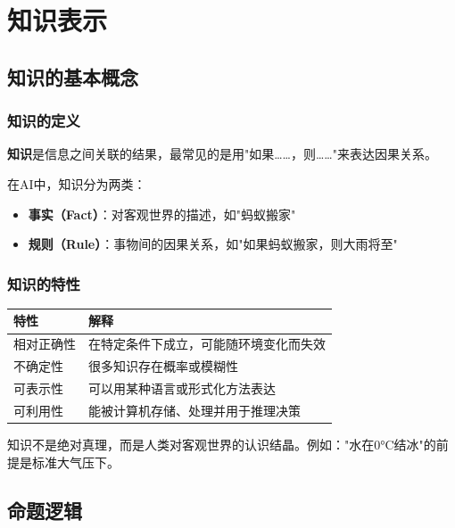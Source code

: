 \chapter{知识表示}

\section{知识的基本概念}

\subsection{知识的定义}
\begin{conceptbox}
\textbf{知识}是信息之间关联的结果，最常见的是用"如果……，则……"来表达因果关系。
\end{conceptbox}

在AI中，知识分为两类：
\begin{itemize}[leftmargin=2em,itemsep=0pt]
    \item \textbf{事实（Fact）}：对客观世界的描述，如"蚂蚁搬家"
    \item \textbf{规则（Rule）}：事物间的因果关系，如"如果蚂蚁搬家，则大雨将至"
\end{itemize}

\subsection{知识的特性}
\begin{table}[htbp]
\centering\small
\begin{tabular}{ll}
\toprule
\textbf{特性} & \textbf{解释} \\
\midrule
相对正确性 & 在特定条件下成立，可能随环境变化而失效 \\
不确定性 & 很多知识存在概率或模糊性 \\
可表示性 & 可以用某种语言或形式化方法表达 \\
可利用性 & 能被计算机存储、处理并用于推理决策 \\
\bottomrule
\end{tabular}
\end{table}

\begin{notebox}
知识不是绝对真理，而是人类对客观世界的认识结晶。例如："水在0°C结冰"的前提是标准大气压下。
\end{notebox}

\section{命题逻辑}

